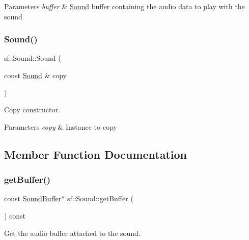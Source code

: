 \begin{DoxyParams}{Parameters}
{\em buffer} & \hyperlink{classsf_1_1_sound}{Sound} buffer containing the audio data to play with the sound \\
\hline
\end{DoxyParams}
\mbox{\label{classsf_1_1_sound_ae05eeed6377932694d86b3011be366c0}} 
\subsubsection{\texorpdfstring{Sound()}{Sound()}\hspace{0.1cm}{\footnotesize\ttfamily [2/2]}}
{\footnotesize\ttfamily sf\+::\+Sound\+::\+Sound (\begin{DoxyParamCaption}\item[{const \hyperlink{classsf_1_1_sound}{Sound} \&}]{copy }\end{DoxyParamCaption})}



Copy constructor. 


\begin{DoxyParams}{Parameters}
{\em copy} & Instance to copy \\
\hline
\end{DoxyParams}


\subsection{Member Function Documentation}
\mbox{\label{classsf_1_1_sound_ab873727ae652c96b5a9437d7f8d8a44d}} 
\subsubsection{\texorpdfstring{get\+Buffer()}{getBuffer()}}
{\footnotesize\ttfamily const \hyperlink{classsf_1_1_sound_buffer}{Sound\+Buffer}$\ast$ sf\+::\+Sound\+::get\+Buffer (\begin{DoxyParamCaption}{ }\end{DoxyParamCaption}) const}



Get the audio buffer attached to the sound. 

